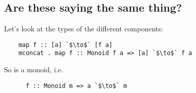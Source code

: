 \subsection*{Are these saying the same thing?}
Let's look at the types of the different components:
\begin{normalfont}
  \begin{verbatim}
    map f :: [a] `$\to$` [f a]
    mconcat . map f :: Monoid f a => [a] `$\to$` f a
  \end{verbatim}
  So  is a monoid, i.e.
  \begin{normalfont}
    \begin{verbatim}
      f :: Monoid m => a `$\to$` m
    \end{verbatim}
  \end{normalfont}
\end{normalfont}
